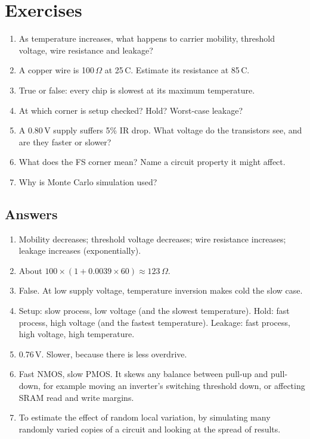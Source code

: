 \section{Exercises}

\begin{enumerate}
  \item As temperature increases, what happens to carrier mobility, threshold voltage, wire resistance and leakage?
  \item A copper wire is 100\,$\Omega$ at 25\,\textdegree C. Estimate its resistance at 85\,\textdegree C.
  \item True or false: every chip is slowest at its maximum temperature.
  \item At which corner is setup checked? Hold? Worst-case leakage?
  \item A 0.80\,V supply suffers 5\% IR drop. What voltage do the transistors see, and are they faster or slower?
  \item What does the FS corner mean? Name a circuit property it might affect.
  \item Why is Monte Carlo simulation used?
\end{enumerate}

\subsection*{Answers}
\begin{enumerate}
  \item Mobility decreases; threshold voltage decreases; wire resistance increases; leakage increases (exponentially).
  \item About $100 \times (1 + 0.0039 \times 60) \approx 123\,\Omega$.
  \item False. At low supply voltage, temperature inversion makes cold the slow case.
  \item Setup: slow process, low voltage (and the slowest temperature). Hold: fast process, high voltage (and the fastest temperature). Leakage: fast process, high voltage, high temperature.
  \item 0.76\,V. Slower, because there is less overdrive.
  \item Fast NMOS, slow PMOS. It skews any balance between pull-up and pull-down, for example moving an inverter's switching threshold down, or affecting SRAM read and write margins.
  \item To estimate the effect of random local variation, by simulating many randomly varied copies of a circuit and looking at the spread of results.
\end{enumerate}
